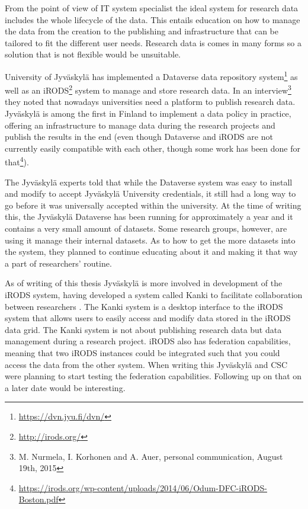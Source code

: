 From the point of view of IT system specialist the ideal system for research
data includes the whole lifecycle of the data. This entails education on how
to manage the data from the creation to the publishing and infrastructure that
can be tailored to fit the different user needs. Research data is comes in
many forms so a solution that is not flexible would be unsuitable.

University of Jyväskylä has implemented a Dataverse data repository 
system\footnote{\url{https://dvn.jyu.fi/dvn/}}
as well as an iRODS\footnote{\url{http://irods.org/}} system to manage and
store research data. In an interview\footnote{M. Nurmela, I. Korhonen and A.
Auer, personal communication, August 19th, 2015} they noted that nowadays
universities need a platform to publish research data. Jyväskylä is among the
first in Finland to implement a data policy in practice, offering an
infrastructure to manage data during the research projects and publish the
results in the end (even though Dataverse and iRODS are not currently
easily compatible with each other, though some work has been done for
that\footnote{\url{https://irods.org/wp-content/uploads/2014/06/Odum-DFC-iRODS-Boston.pdf}}).

The Jyväskylä experts told that while the Dataverse system was easy to install
and modify to accept Jyväskylä University credentials, it still had a long way to go
before it was universally accepted within the university. At the time of
writing this, the Jyväskylä Dataverse has been running for approximately a
year and it contains a very small amount of datasets. Some research groups,
however, are using it manage their internal datasets. As to how to get the
more datasets into the system, they planned to continue educating about it
and making it that way a part of researchers' routine.

As of writing of this thesis Jyväskylä is more involved in development of the iRODS system, having
developed a system called Kanki to facilitate collaboration between researchers
\cite{irodsinproceedings}. The Kanki system is a desktop interface to the iRODS
system that allows users to easily access and modify data stored in the iRODS
data grid. The Kanki system is not about publishing research data but data
management during a research project. iRODS also has federation capabilities,
meaning that two iRODS instances could be integrated such that you could
access the data from the other system. When writing this Jyväskylä and CSC
were planning to start testing the federation capabilities. Following up on that
on a later date would be interesting.

